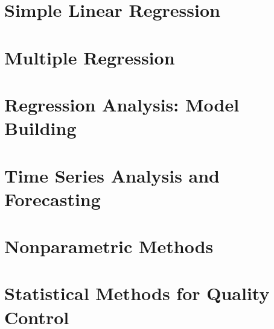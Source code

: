 \documentclass[12pt,a4paper]{report}
\begin{document}
\chapter{Simple Linear Regression}

\chapter{Multiple Regression}

\chapter{Regression Analysis: Model Building}

\chapter{Time Series Analysis and Forecasting}

\chapter{Nonparametric Methods}

\chapter{Statistical Methods for Quality Control}

\nocite{*}


\end{document}
